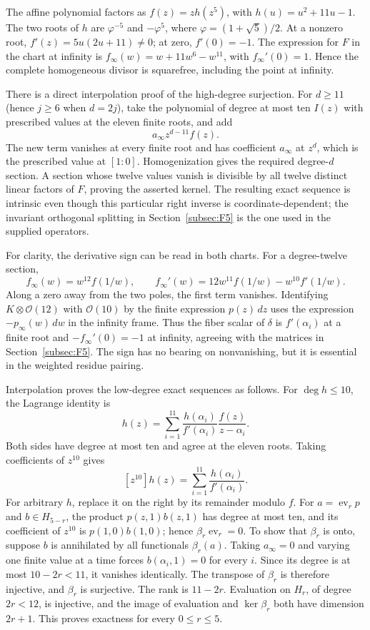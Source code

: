 \documentclass[11pt,a4paper]{article}
\begin{document}
The affine polynomial factors as \(f(z)=z h(z^5)\), with \(h(u)=u^2+11u-1\). The two roots of \(h\) are \(\varphi^{-5}\) and \(-\varphi^5\), where \(\varphi=(1+\sqrt5)/2\). At a nonzero root, \(f'(z)=5u(2u+11)\ne0\); at zero, \(f'(0)=-1\). The expression for \(F\) in the chart at infinity is \(f_\infty(w)=w+11w^6-w^{11}\), with \(f_\infty'(0)=1\). Hence the complete homogeneous divisor is squarefree, including the point at infinity.

There is a direct interpolation proof of the high-degree surjection. For \(d\geq11\) (hence \(j\geq6\) when \(d=2j\)), take the polynomial of degree at most ten \(I(z)\) with prescribed values at the eleven finite roots, and add
\[
a_\infty z^{d-11}f(z).
\]
The new term vanishes at every finite root and has coefficient \(a_\infty\) at \(z^d\), which is the prescribed value at \([1:0]\). Homogenization gives the required degree-\(d\) section. A section whose twelve values vanish is divisible by all twelve distinct linear factors of \(F\), proving the asserted kernel. The resulting exact sequence is intrinsic even though this particular right inverse is coordinate-dependent; the invariant orthogonal splitting in Section~\ref{subsec:F5} is the one used in the supplied operators.

For clarity, the derivative sign can be read in both charts. For a degree-twelve section,
\[
f_\infty(w)=w^{12}f(1/w),\qquad
f_\infty'(w)=12w^{11}f(1/w)-w^{10}f'(1/w).
\]
Along a zero away from the two poles, the first term vanishes. Identifying \(K\otimes\mathcal O(12)\) with \(\mathcal O(10)\) by the finite expression \(p(z)\,dz\) uses the expression \(-p_\infty(w)\,dw\) in the infinity frame. Thus the fiber scalar of \(\delta\) is \(f'(\alpha_i)\) at a finite root and \(-f_\infty'(0)=-1\) at infinity, agreeing with the matrices in Section~\ref{subsec:F5}. The sign has no bearing on nonvanishing, but it is essential in the weighted residue pairing.

Interpolation proves the low-degree exact sequences as follows. For \(\deg h\leq10\), the Lagrange identity is
\[
h(z)=\sum_{i=1}^{11}\frac{h(\alpha_i)}{f'(\alpha_i)}
                           \frac{f(z)}{z-\alpha_i}.
\]
Both sides have degree at most ten and agree at the eleven roots. Taking coefficients of \(z^{10}\) gives
\[
[z^{10}]h(z)=\sum_{i=1}^{11}\frac{h(\alpha_i)}{f'(\alpha_i)}.
\]
For arbitrary \(h\), replace it on the right by its remainder modulo \(f\). For \(a=\operatorname{ev}_r p\) and \(b\in H_{5-r}\), the product \(p(z,1)b(z,1)\) has degree at most ten, and its coefficient of \(z^{10}\) is \(p(1,0)b(1,0)\); hence \(\beta_r\operatorname{ev}_r=0\). To show that \(\beta_r\) is onto, suppose \(b\) is annihilated by all functionals \(\beta_r(a)\). Taking \(a_\infty=0\) and varying one finite value at a time forces \(b(\alpha_i,1)=0\) for every \(i\). Since its degree is at most \(10-2r<11\), it vanishes identically. The transpose of \(\beta_r\) is therefore injective, and \(\beta_r\) is surjective. The rank is \(11-2r\). Evaluation on \(H_r\), of degree \(2r<12\), is injective, and the image of evaluation and \(\ker\beta_r\) both have dimension \(2r+1\). This proves exactness for every \(0\leq r\leq5\).
\end{document}
